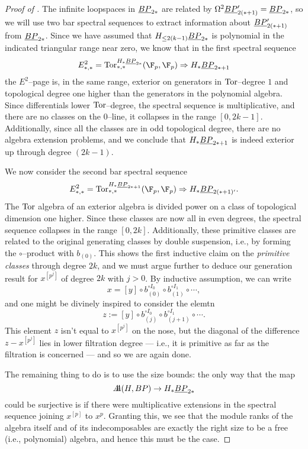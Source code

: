 \begin{proof}[{Proof of }]
The infinite loopspaces in $\underline{\smash{BP}}_{2*}$ are related by $\Omega^2 \underline{\smash{BP}}_{2(*+1)}' = \underline{\smash{BP}}_{2*}$, so we will use two bar spectral sequences to extract information about $\underline{\smash{BP}}_{2(*+1)}'$ from $\underline{\smash{BP}}_{2*}$.  Since we have assumed that $H_{\le 2(k-1)} \underline{\smash{BP}}_{2*}$ is polynomial in the indicated triangular range near zero, we know that in the first spectral sequence \[E^2_{*, *} = \Tor^{H_* \OS{BP}{2*}}_{*, *}(\F_p, \F_p) \Rightarrow H_* \OS{BP}{2*+1}\] the $E^2$--page is, in the same range, exterior on generators in $\operatorname{Tor}$--degree $1$ and topological degree one higher than the generators in the polynomial algebra.  Since differentials lower $\operatorname{Tor}$--degree, the spectral sequence is multiplicative, and there are no classes on the $0$--line, it collapses in the range $[0, 2k-1]$.  Additionally, since all the classes are in odd topological degree, there are no algebra extension problems, and we conclude that $H_* \underline{\smash{BP}}_{2*+1}$ is indeed exterior up through degree $(2k-1)$.

We now consider the second bar spectral sequence \[E^2_{*, *} = \Tor^{H_* \OS{BP}{2*+1}}_{*, *}(\F_p, \F_p) \Rightarrow H_* \OS{BP}{2(*+1)'}.\]  The $\operatorname{Tor}$ algebra of an exterior algebra is divided power on a class of topological dimension one higher.  Since these classes are now all in even degrees, the spectral sequence collapses in the range $[0, 2k]$.  Additionally, these primitive classes are related to the original generating classes by double suspension, i.e., by forming the $\circ$--product with $b_{(0)}$.  This shows the first inductive claim on the \emph{primitive classes} through degree $2k$, and we must argue further to deduce our generation result for $x^{[p^j]}$ of degree $2k$ with $j > 0$.  By inductive assumption, we can write \[x = [y] \circ b_{(0)}^{\circ I_0} \circ b_{(1)}^{\circ I_1} \circ \cdots,\] and one might be divinely inspired to consider the elemtn \[z := [y] \circ b_{(j)}^{\circ I_0} \circ b_{(j+1)}^{\circ I_1} \circ \cdots.\]  This element $z$ isn't equal to $x^{[p^j]}$ on the nose, but the diagonal of the difference $z - x^{[p^j]}$ lies in lower filtration degree --- i.e., it is primitive as far as the filtration is concerned --- and so we are again done.

The remaining thing to do is to use the size bounds: the only way that the map \[A\!\!\!A(H, BP) \to H_* \underline{\smash{BP}}_{2*}\] could be surjective is if there were multiplicative extensions in the spectral sequence joining $x^{[p]}$ to $x^p$.  Granting this, we see that the module ranks of the algebra itself and of its indecomposables are exactly the right size to be a free (i.e., polynomial) algebra, and hence this must be the case.
\end{proof}

